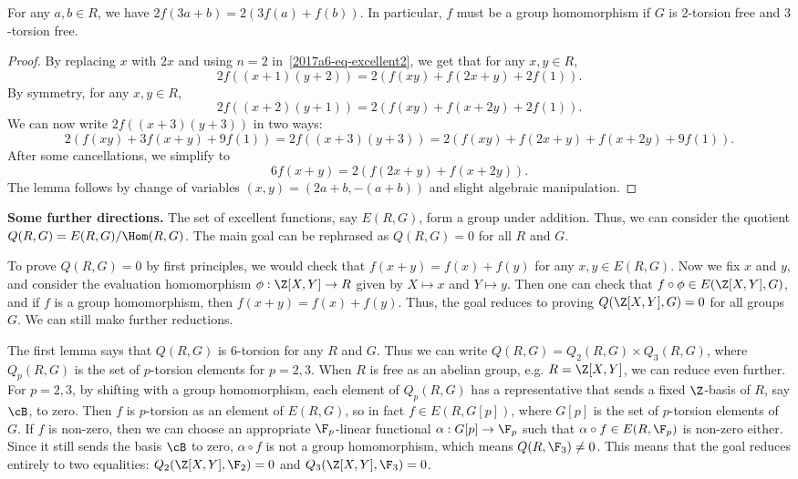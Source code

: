\begin{lemma}\label{2017a6-excellent-main}
For any $a, b \in R$, we have $2 f(3a + b) = 2 (3 f(a) + f(b))$.
In particular, $f$ must be a group homomorphism if $G$ is $2$-torsion free and $3$-torsion free.
\end{lemma}
\begin{proof}
By replacing $x$ with $2x$ and using $n = 2$ in~\eqref{2017a6-eq-excellent2}, we get that for any $x, y \in R$,
\[ 2 f((x + 1)(y + 2)) = 2 (f(xy) + f(2x + y) + 2 f(1)). \]
By symmetry, for any $x, y \in R$,
\[ 2 f((x + 2)(y + 1)) = 2 (f(xy) + f(x + 2y) + 2 f(1)). \]
We can now write $2 f((x + 3)(y + 3))$ in two ways:
\[ 2(f(xy) + 3 f(x + y) + 9 f(1)) = 2 f((x + 3)(y + 3)) = 2 (f(xy) + f(2x + y) + f(x + 2y) + 9 f(1)). \]
After some cancellations, we simplify to
\[ 6 f(x + y) = 2 (f(2x + y) + f(x + 2y)). \]
The lemma follows by change of variables $(x, y) = (2a + b, -(a + b))$ and slight algebraic manipulation.
\end{proof}



\textbf{Some further directions.}
The set of excellent functions, say $E(R, G)$, form a group under addition.
Thus, we can consider the quotient $Q(R, G) = E(R, G)/\Hom(R, G)$.
The main goal can be rephrased as $Q(R, G) = 0$ for all $R$ and $G$.

To prove $Q(R, G) = 0$ by first principles, we would check that $f(x + y) = f(x) + f(y)$ for any $x, y \in E(R, G)$.
Now we fix $x$ and $y$, and consider the evaluation homomorphism $\phi : \Z[X, Y] \to R$ given by $X \mapsto x$ and $Y \mapsto y$.
Then one can check that $f \circ \phi \in E(\Z[X, Y], G)$, and if $f$ is a group homomorphism, then $f(x + y) = f(x) + f(y)$.
Thus, the goal reduces to proving $Q(\Z[X, Y], G) = 0$ for all groups $G$.
We can still make further reductions.

The first lemma says that $Q(R, G)$ is $6$-torsion for any $R$ and $G$.
Thus we can write $Q(R, G) = Q_2(R, G) \times Q_3(R, G)$, where $Q_p(R, G)$ is the set of $p$-torsion elements for $p = 2, 3$.
When $R$ is free as an abelian group, e.g. $R = \Z[X, Y]$, we can reduce even further.
For $p = 2, 3$, by shifting with a group homomorphism, each element of $Q_p(R, G)$ has a representative that sends a fixed $\Z$-basis of $R$, say $\cB$, to zero.
Then $f$ is $p$-torsion as an element of $E(R, G)$, so in fact $f \in E(R, G[p])$, where $G[p]$ is the set of $p$-torsion elements of $G$.
If $f$ is non-zero, then we can choose an appropriate $\F_p$-linear functional $\alpha : G[p] \to \F_p$ such that $\alpha \circ f \in E(R, \F_p)$ is non-zero either.
Since it still sends the basis $\cB$ to zero, $\alpha \circ f$ is not a group homomorphism, which means $Q(R, \F_3) \neq 0$.
This means that the goal reduces entirely to two equalities: $Q_2(\Z[X, Y], \F_2) = 0$ and $Q_3(\Z[X, Y], \F_3) = 0$.

